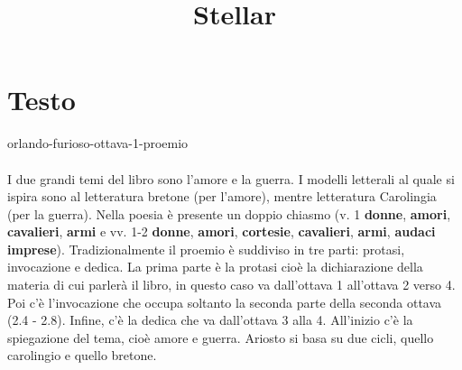 \documentclass[preview]{standalone}
\begin{document}
\title{Stellar}
\genpage

\section{Testo}


\begin{snippet}{orlando-furioso-ottava-1-proemio}
    \\\\
    I due grandi temi del libro sono l'amore e la guerra.
    I modelli letterali al quale si ispira sono al letteratura bretone (per l'amore),
    mentre letteratura Carolingia (per la guerra).
    Nella poesia è presente un doppio chiasmo (v. 1 \textbf{donne}, \textbf{amori}, \textbf{cavalieri},
    \textbf{armi} e vv. 1-2 \textbf{donne}, \textbf{amori}, \textbf{cortesie}, \textbf{cavalieri}, \textbf{armi}, \textbf{audaci imprese}).
    Tradizionalmente il proemio è suddiviso in tre parti: protasi, invocazione e dedica.
    La prima parte è la protasi cioè la dichiarazione della materia di
    cui parlerà il libro, in questo caso va dall'ottava 1 all'ottava 2 verso 4.
    Poi c'è l'invocazione che occupa soltanto la seconda parte della seconda ottava
    (2.4 - 2.8). Infine, c'è la dedica che va dall'ottava 3 alla 4.
    All'inizio c'è la spiegazione del tema, cioè amore e guerra.
    Ariosto si basa su due cicli, quello carolingio e quello bretone.

\end{snippet}
\end{document}
